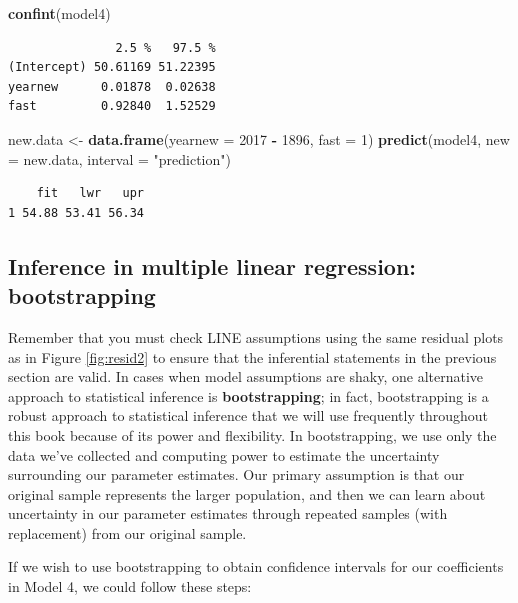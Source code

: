 \documentclass[
]{krantz}
\newenvironment{Shaded}{\begin{snugshade}}{\end{snugshade}}
\newcommand{\DataTypeTok}[1]{\textcolor[rgb]{0.27,0.27,0.27}{#1}}
\newcommand{\DecValTok}[1]{\textcolor[rgb]{0.06,0.06,0.06}{#1}}
\newcommand{\KeywordTok}[1]{\textcolor[rgb]{0.27,0.27,0.27}{\textbf{#1}}}
\newcommand{\NormalTok}[1]{#1}
\newcommand{\OperatorTok}[1]{\textcolor[rgb]{0.43,0.43,0.43}{\textbf{#1}}}
\newcommand{\StringTok}[1]{\textcolor[rgb]{0.5,0.5,0.5}{#1}}
\begin{document}
\begin{Shaded}
\begin{Highlighting}[]
\KeywordTok{confint}\NormalTok{(model4)}
\end{Highlighting}
\end{Shaded}

\begin{verbatim}
               2.5 %   97.5 %
(Intercept) 50.61169 51.22395
yearnew      0.01878  0.02638
fast         0.92840  1.52529
\end{verbatim}

\begin{Shaded}
\begin{Highlighting}[]
\NormalTok{new.data <-}\StringTok{ }\KeywordTok{data.frame}\NormalTok{(}\DataTypeTok{yearnew =} \DecValTok{2017} \OperatorTok{-}\StringTok{ }\DecValTok{1896}\NormalTok{, }\DataTypeTok{fast =} \DecValTok{1}\NormalTok{) }
\KeywordTok{predict}\NormalTok{(model4, }\DataTypeTok{new =}\NormalTok{ new.data, }\DataTypeTok{interval =} \StringTok{"prediction"}\NormalTok{)}
\end{Highlighting}
\end{Shaded}

\begin{verbatim}
    fit   lwr   upr
1 54.88 53.41 56.34
\end{verbatim}

\hypertarget{multreg-boot}{%
\subsection{Inference in multiple linear regression: bootstrapping}\label{multreg-boot}}

Remember that you must check LINE assumptions using the same residual plots as in Figure \ref{fig:resid2} to ensure that the inferential statements in the previous section are valid. In cases when model assumptions are shaky, one alternative approach to statistical inference is \textbf{bootstrapping}; in fact, bootstrapping is a robust approach to statistical inference that we will use frequently throughout this book because of its power and flexibility. In bootstrapping, we use only the data we've collected and computing power to estimate the uncertainty surrounding our parameter estimates. Our primary assumption is that our original sample represents the larger population, and then we can learn about uncertainty in our parameter estimates through repeated samples (with replacement) from our original sample.

If we wish to use bootstrapping to obtain confidence intervals for our coefficients in Model 4, we could follow these steps:
\end{document}
